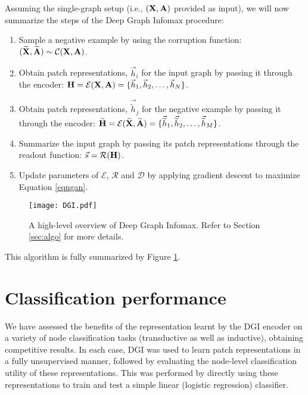 \documentclass{article} \usepackage{iclr2019_conference,times}
\begin{document}
Assuming the single-graph setup (i.e., $({\bf X}, {\bf A})$ provided as input), we will now summarize the steps of the Deep Graph Infomax procedure:
\begin{enumerate}
	\item Sample a negative example by using the corruption function: $({\bf \widetilde{X}}, {\bf \widetilde{A}}) \sim \mathcal{C}({\bf X}, {\bf A})$.
	\item Obtain patch representations, $\vec{h}_i$ for the input graph by passing it through the encoder: ${\bf H} = \mathcal{E}({\bf X}, {\bf A}) = \{\vec{h}_1, \vec{h}_2, \dots, \vec{h}_N\}$.
	\item Obtain patch representations, $\vec{\widetilde{h}}_j$ for the negative example by passing it through the encoder: ${\bf \widetilde{H}} = \mathcal{E}({\bf \widetilde{X}}, {\bf \widetilde{A}}) = \{\vec{\widetilde{h}}_1, \vec{\widetilde{h}}_2, \dots, \vec{\widetilde{h}}_M\}$.
	\item Summarize the input graph by passing its patch representations through the readout function: $\vec{s} = \mathcal{R}({\bf H})$.
	\item Update parameters of $\mathcal{E}$, $\mathcal{R}$ and $\mathcal{D}$ by applying gradient descent to maximize Equation \ref{eqngan}.
\end{enumerate}

\begin{figure}
\centering 
\texttt{[image: DGI.pdf]} 
\caption{A high-level overview of Deep Graph Infomax. Refer to Section \ref{sec:algo} for more details.}\label{fig:dgi}
\end{figure}

This algorithm is fully summarized by Figure \ref{fig:dgi}.

\section{Classification performance}

We have assessed the benefits of the representation learnt by the DGI encoder on a variety of node classification tasks (transductive as well as inductive), obtaining competitive results. In each case, DGI was used to learn patch representations in a fully unsupervised manner, followed by evaluating the node-level classification utility of these representations. This was performed by directly using these representations to train and test a simple linear (logistic regression) classifier. 
\end{document}
